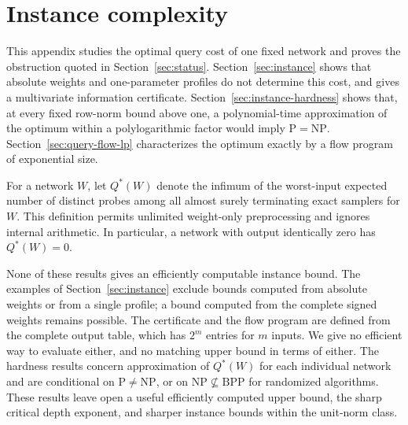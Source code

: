 \section{Instance complexity}\label{app:instance}

This appendix studies the optimal query cost of one fixed network and proves
the obstruction quoted in Section~\ref{sec:status}.
Section~\ref{sec:instance} shows that absolute weights and
one-parameter profiles do not determine this cost, and gives a
multivariate information certificate.
Section~\ref{sec:instance-hardness} shows that, at every fixed
row-norm bound above one, a polynomial-time approximation of the
optimum within a polylogarithmic factor would imply
\(\mathrm P=\mathrm{NP}\).
Section~\ref{sec:query-flow-lp} characterizes the optimum exactly by a
flow program of exponential size.

For a network \(W\), let \(Q^*(W)\) denote the infimum of the
worst-input expected number of distinct probes among all almost surely
terminating exact samplers for \(W\).  This definition permits
unlimited weight-only preprocessing and ignores internal arithmetic.
In particular, a network with output identically zero has
\(Q^*(W)=0\).

None of these results gives an efficiently computable instance bound.
The examples of Section~\ref{sec:instance} exclude bounds computed
from absolute weights or from a single profile; a bound computed from
the complete signed weights remains possible.  The certificate and the
flow program are defined from the complete output table, which has
\(2^m\) entries for \(m\) inputs.  We give no efficient way to evaluate
either, and no matching upper bound in terms of either.  The
hardness results concern approximation of \(Q^*(W)\) for each
individual network and are conditional on \(\mathrm P\ne\mathrm{NP}\),
or on \(\mathrm{NP}\not\subseteq\mathrm{BPP}\) for randomized algorithms.
These results leave open a useful efficiently
computed upper bound, the sharp critical depth exponent, and sharper
instance bounds within the unit-norm class.




